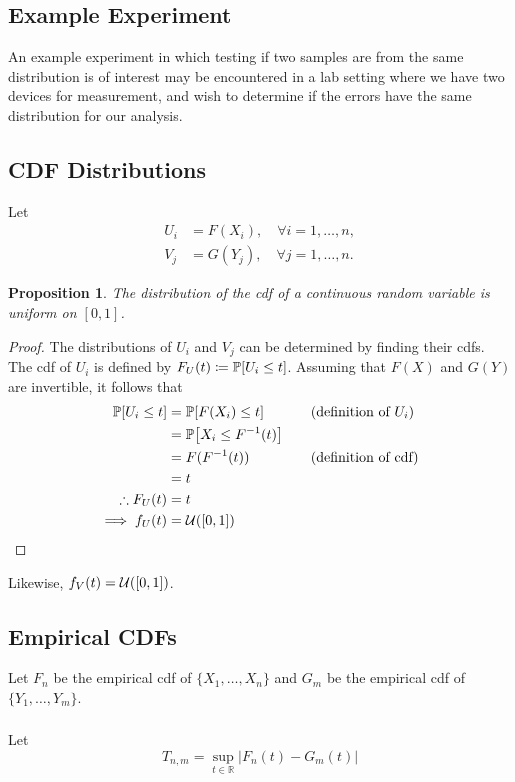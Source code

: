 \documentclass[letterpaper, oneside, reqno]{amsart}
\newtheorem{prop}{Proposition}[section]
\renewcommand{\(}{\mleft(}
\renewcommand{\)}{\mright)}
\renewcommand{\[}{\mleft[}
\renewcommand{\]}{\mright]}
\newcommand{\Prob}[1]{\mathbb{P}\[#1\]}
\newcommand{\R}{\mathbb{R}}  %
\newcommand{\U}[2]{\mathcal{U}\(\[ #1, #2 \]\)}
\newcommand{\by}[1]{&\quad&\text{(#1)}}
\begin{document}
\subsection{Example Experiment}
An example experiment in which testing if two samples are from the same
distribution is of interest may be encountered in a lab setting where we have
two devices for measurement, and wish to determine if the errors have the same
distribution for our analysis. 

\subsection{CDF Distributions}
Let 
\begin{align*}
  U_i &= F(X_i), \quad \forall i = 1, \dots, n, \\
  V_j &= G(Y_j), \quad \forall j = 1, \dots, n.
\end{align*}

\begin{prop}
  The distribution of the cdf of a continuous random variable is uniform on $[0,
  1]$.
\end{prop}

\begin{proof}
The distributions of $U_i$ and $V_j$ can be determined by finding their cdfs.
The cdf of $U_i$ is defined by $F_U(t) \coloneqq \Prob{U_i \le t}$. Assuming that $F(X)$ and $G(Y)$ are invertible, it follows that
\begin{alignat*}{3}
  \Prob{U_i \le t} &= \Prob{F(X_i) \le t} \by{definition of $U_i$} \\
                   &= \Prob{X_i \le F^{-1}(t)} \\
                   &= F(F^{-1}(t)) \by{definition of cdf} \\
                   &= t \\
  \therefore F_U(t) &= t \\
  \implies f_U(t) &= \U{0}{1} \qedhere
\end{alignat*}
\end{proof}
Likewise, $f_V(t) = \U{0}{1}$.

\subsection{Empirical CDFs}
Let $F_n$ be the empirical cdf of $\{X_1, \dots, X_n\}$ and $G_m$ be the
empirical cdf of $\{Y_1, \dots, Y_m\}$.

\subsubsection{}
Let
\begin{equation}
  T_{n,m} = \sup_{t \in \R} \left| F_n(t) - G_m(t) \right|
\end{equation}
\end{document}
